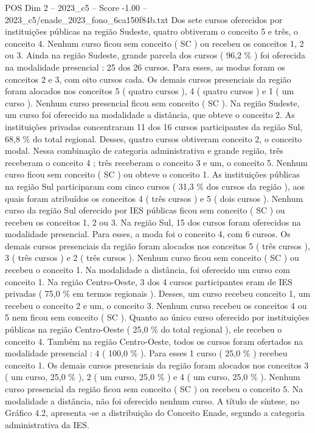 \begin{textsample}{POS Dim 2 – 2023\_c5 – Score -1.00 – 2023\_c5/enade\_2023\_fono\_6ca150f84b.txt}
Dos sete cursos oferecidos por instituições públicas na região Sudeste, quatro obtiveram o conceito 5 e três, o conceito 4.
Nenhum curso ficou sem conceito ( SC ) ou recebeu os conceitos 1, 2 ou 3.
Ainda na região Sudeste, grande parcela dos cursos ( 96,2 \% ) foi oferecida na modalidade presencial : 25 dos 26 cursos.
Para esses, as modas foram os conceitos 2 e 3, com oito cursos cada.
Os demais cursos presenciais da região foram alocados nos conceitos 5 ( quatro cursos ), 4 ( quatro cursos ) e 1 ( um curso ).
Nenhum curso presencial ficou sem conceito ( SC ).
Na região Sudeste, um curso foi oferecido na modalidade a distância, que obteve o conceito 2.
As instituições privadas concentraram 11 dos 16 cursos participantes da região Sul, 68,8 \% do total regional.
Desses, quatro cursos obtiveram conceito 2, o conceito modal.
Nessa combinação de categoria administrativa e grande região, três receberam o conceito 4 ; três receberam o conceito 3 e um, o conceito 5.
Nenhum curso ficou sem conceito ( SC ) ou obteve o conceito 1.
As instituições públicas na região Sul participaram com cinco cursos ( 31,3 \% dos cursos da região ), aos quais foram atribuídos os conceitos 4 ( três cursos ) e 5 ( dois cursos ).
Nenhum curso da região Sul oferecido por IES públicas ficou sem conceito ( SC ) ou recebeu os conceitos 1, 2 ou 3.
Na região Sul, 15 dos cursos foram oferecidos na modalidade presencial.
Para esses, a moda foi o conceito 4, com 6 cursos.
Os demais cursos presenciais da região foram alocados nos conceitos 5 ( três cursos ), 3 ( três cursos ) e 2 ( três cursos ).
Nenhum curso ficou sem conceito ( SC ) ou recebeu o conceito 1.
Na modalidade a distância, foi oferecido um curso com conceito 1.
Na região Centro-Oeste, 3 dos 4 cursos participantes eram de IES privadas ( 75,0 \% em termos regionais ).
Desses, um curso recebeu conceito 1, um recebeu o conceito 2 e um, o conceito 3.
Nenhum curso recebeu os conceitos 4 ou 5 nem ficou sem conceito ( SC ).
Quanto ao único curso oferecido por instituições públicas na região Centro-Oeste ( 25,0 \% do total regional ), ele recebeu o conceito 4.
Também na região Centro-Oeste, todos os cursos foram ofertados na modalidade presencial : 4 ( 100,0 \% ).
Para esses 1 curso ( 25,0 \% ) recebeu conceito 1.
Os demais cursos presenciais da região foram alocados nos conceitos 3 ( um curso, 25,0 \% ), 2 ( um curso, 25,0 \% ) e 4 ( um curso, 25,0 \% ).
Nenhum curso presencial da região ficou sem conceito ( SC ) ou recebeu o conceito 5.
Na modalidade a distância, não foi oferecido nenhum curso.
A título de síntese, no Gráfico 4.2, apresenta -se a distribuição do Conceito Enade, segundo a categoria administrativa da IES.

\end{textsample}
